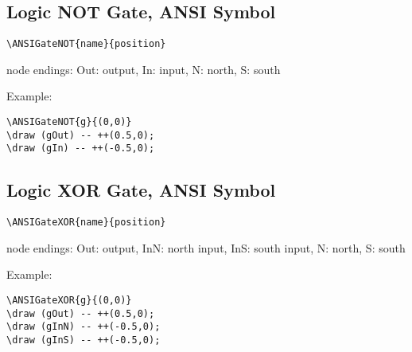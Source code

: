 \documentclass[parskip=full]{scrartcl}
\begin{document}
\subsection{Logic NOT Gate, ANSI Symbol}

\begin{verbatim}
\ANSIGateNOT{name}{position}
\end{verbatim}
node endings: Out: output, In: input,
              N: north, S: south

Example:\\
\begin{minipage}{0.8\textwidth}
\begin{verbatim}
\ANSIGateNOT{g}{(0,0)}
\draw (gOut) -- ++(0.5,0);
\draw (gIn) -- ++(-0.5,0);
\end{verbatim}
\end{minipage}
\begin{minipage}{0.19\textwidth}
\end{minipage}

\subsection{Logic XOR Gate, ANSI Symbol}

\begin{verbatim}
\ANSIGateXOR{name}{position}
\end{verbatim}
node endings: Out: output,
              InN: north input, InS: south input,
              N: north, S: south

Example:\\
\begin{minipage}{0.8\textwidth}
\begin{verbatim}
\ANSIGateXOR{g}{(0,0)}
\draw (gOut) -- ++(0.5,0);
\draw (gInN) -- ++(-0.5,0);
\draw (gInS) -- ++(-0.5,0);
\end{verbatim}
\end{minipage}
\begin{minipage}{0.19\textwidth}
\end{minipage}
\end{document}
